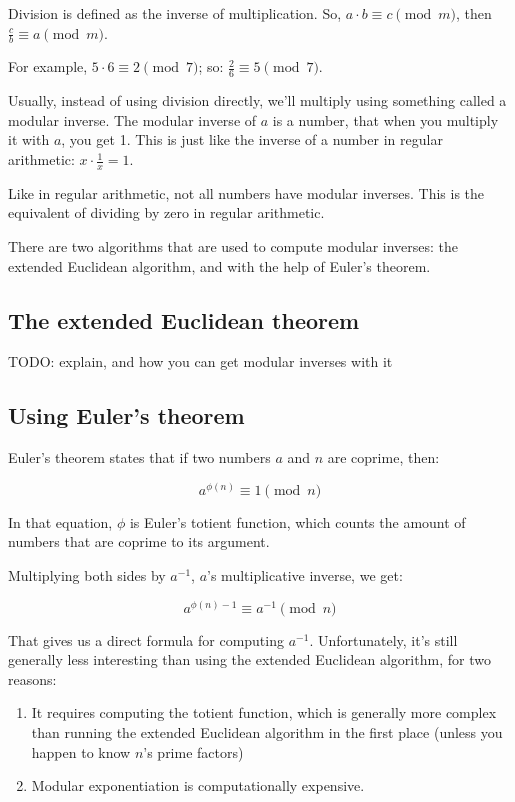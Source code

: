\documentclass[11pt,ebook,table,dvipsnames]{memoir}
\begin{document}
Division is defined as the inverse of multiplication. So, $a \cdot b
\equiv c \pmod m$, then $\frac{c}{b} \equiv a \pmod m$.

For example, $5 \cdot 6 \equiv 2 \pmod 7$; so: $\frac{2}{6} \equiv 5
\pmod 7$.

Usually, instead of using division directly, we'll multiply using
something called a modular inverse. The modular inverse of $a$ is a
number, that when you multiply it with $a$, you get 1. This is just
like the inverse of a number in regular arithmetic: $x \cdot
\frac{1}{x} = 1$.

Like in regular arithmetic, not all numbers have modular inverses.
This is the equivalent of dividing by zero in regular arithmetic.

There are two algorithms that are used to compute modular inverses:
the extended Euclidean algorithm, and with the help of Euler's
theorem.

\subsection{The extended Euclidean theorem}
\label{sec-4-1-4-1}

TODO: explain, and how you can get modular inverses with it
\subsection{Using Euler's theorem}
\label{sec-4-1-4-2}

Euler's theorem states that if two numbers $a$ and $n$ are coprime,
then:

\[
a^{\phi(n)} \equiv 1 \pmod n
\]

In that equation, $\phi$ is Euler's totient function, which counts the
amount of numbers that are coprime to its argument.

Multiplying both sides by $a^{-1}$, $a$'s multiplicative inverse, we
get:

\[
a^{\phi(n) - 1} \equiv a^{-1} \pmod n
\]

That gives us a direct formula for computing $a^{-1}$. Unfortunately,
it's still generally less interesting than using the extended
Euclidean algorithm, for two reasons:

\begin{enumerate}
\item It requires computing the totient function, which is generally more
complex than running the extended Euclidean algorithm in the first
place (unless you happen to know $n$'s prime factors)
\item Modular exponentiation is computationally expensive.
\end{enumerate}
\end{document}
